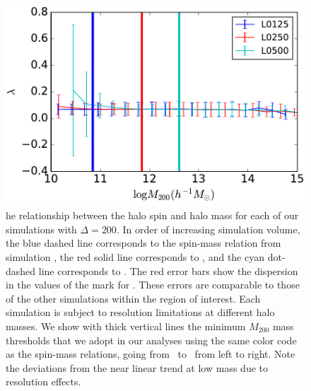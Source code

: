 \documentclass[usenatbib]{mnras}
\begin{document}
\begin{figure}
\centering
\includegraphics[width=.5\textwidth]{masscut_spin_d200.pdf}
\caption{
he relationship between the halo spin and halo mass for each of our simulations with $\Delta =200$. 
In order of increasing simulation volume, the blue dashed line corresponds to the spin-mass relation from simulation 
\simA, the red solid line corresponds to \simB, and the cyan dot-dashed line corresponds to \simC. The red error bars show the
dispersion in the values of the mark for \simB. These errors are comparable to those of the other simulations
within the region of interest.
Each simulation is subject to resolution limitations at different halo masses. We show with thick vertical lines 
the minimum $M_{200}$ mass thresholds that we adopt in our analyses using the same color code as 
the spin-mass relations, going from \simA \ to \simC \ from left to right. Note the deviations from the near linear
trend at low mass due to resolution effects.
}
\label{fig:spinrelation}
\end{figure}
\end{document}
